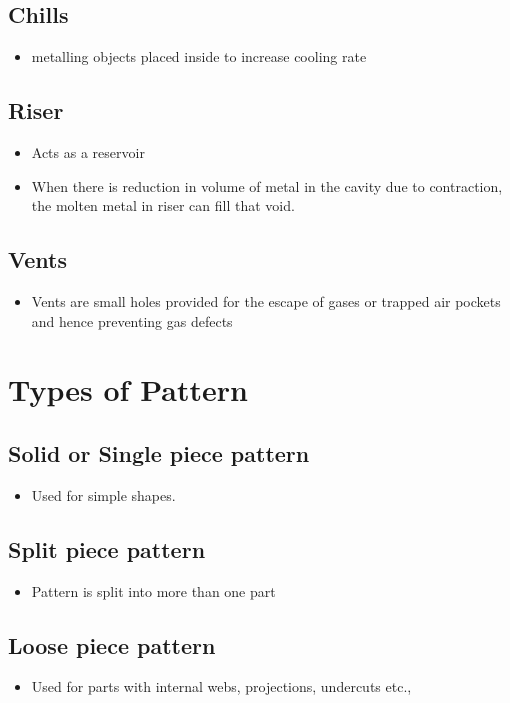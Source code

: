 \documentclass[8pt]{report}
\begin{document}
	\subsection{Chills}
		\begin{itemize}
			\item metalling objects placed inside to increase cooling rate
		\end{itemize}
	\subsection{Riser}
		\begin{itemize}
			\item Acts as a reservoir
			\item When there is reduction in volume of metal in the cavity due to contraction, the molten metal in riser can fill that void. 
		\end{itemize}
	\subsection{Vents}
		\begin{itemize}
			\item Vents are small holes provided for the escape of gases or trapped air pockets and hence preventing gas defects 
		\end{itemize}\hrulefill
\section{Types of Pattern}
	\subsection{Solid or Single piece pattern}
		\begin{itemize}
			\item Used for simple shapes. 
		\end{itemize}
	\subsection{Split piece pattern}
		\begin{itemize}
			\item Pattern is split into more than one part
		\end{itemize}
	\subsection{Loose piece pattern}
		\begin{itemize}
			\item Used for parts with internal webs, projections, undercuts etc.,
		\end{itemize}
\end{document}
